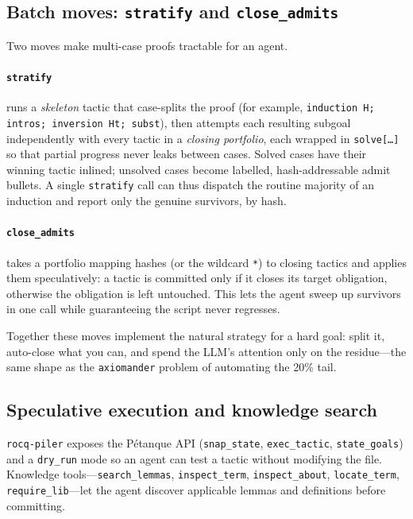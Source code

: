 \documentclass[11pt,a4paper]{article}
\newcommand{\tool}{\texttt{rocq-piler}\xspace}
\newcommand{\axm}{\texttt{axiomander}\xspace}
\begin{document}
\subsection{Batch moves: \texttt{stratify} and \texttt{close\_admits}}

Two moves make multi-case proofs tractable for an agent.

\paragraph{\texttt{stratify}} runs a \emph{skeleton} tactic that case-splits the
proof (for example, \texttt{induction H; intros; inversion Ht; subst}), then
attempts each resulting subgoal independently with every tactic in a
\emph{closing portfolio}, each wrapped in \texttt{solve[\ldots]} so that partial
progress never leaks between cases. Solved cases have their winning tactic
inlined; unsolved cases become labelled, hash-addressable admit bullets. A
single \texttt{stratify} call can thus dispatch the routine majority of an
induction and report only the genuine survivors, by hash.

\paragraph{\texttt{close\_admits}} takes a portfolio mapping hashes (or the
wildcard \texttt{*}) to closing tactics and applies them speculatively: a tactic
is committed only if it closes its target obligation, otherwise the obligation is
left untouched. This lets the agent sweep up survivors in one call while
guaranteeing the script never regresses.

Together these moves implement the natural strategy for a hard goal: split it,
auto-close what you can, and spend the LLM's attention only on the residue---the
same shape as the \axm problem of automating the 20\% tail.

\subsection{Speculative execution and knowledge search}

\tool exposes the Pétanque API (\texttt{snap\_state}, \texttt{exec\_tactic},
\texttt{state\_goals}) and a \texttt{dry\_run} mode so an agent can test a tactic
without modifying the file. Knowledge tools---\texttt{search\_lemmas},
\texttt{inspect\_term}, \texttt{inspect\_about}, \texttt{locate\_term},
\texttt{require\_lib}---let the agent discover applicable lemmas and definitions
before committing.
\end{document}
